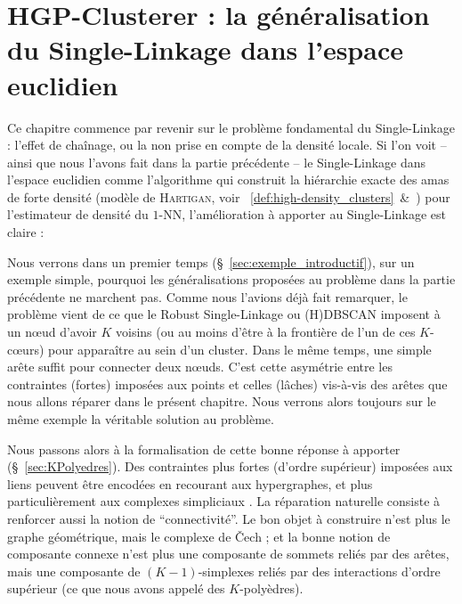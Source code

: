 \chapter{HGP-Clusterer : la généralisation du Single-Linkage dans l'espace euclidien} 
\label{chap:hgp_clusterer}

Ce chapitre commence par revenir sur le problème fondamental du Single-Linkage : l'effet de chaînage, ou la non prise en compte de la densité locale.
Si l'on voit -- ainsi que nous l'avons fait dans la partie précédente -- le Single-Linkage dans l'espace euclidien comme l'algorithme qui construit la hiérarchie exacte des amas de forte densité (modèle de \textsc{Hartigan}, voir \Def~\ref{def:high-density_clusters}~\&~) pour l'estimateur de densité du $1$-NN, l'amélioration à apporter au Single-Linkage est claire :

Nous verrons dans un premier temps (\S~\ref{sec:exemple_introductif}), sur un exemple simple, pourquoi les généralisations proposées au problème dans la partie précédente ne marchent pas. 
Comme nous l'avions déjà fait remarquer, le problème vient de ce que le Robust Single-Linkage \cite{RobustSingleLinkage2010} ou (H)DBSCAN \cite{HDBSCAN, HDBSCAN2017} imposent à un n\oe ud d'avoir $K$ voisins  (ou au moins d'être à la frontière de l'un de ces $K$-cœurs) pour apparaître au sein d'un cluster. Dans le même temps, une simple arête suffit pour connecter deux n\oe uds.
C'est cette asymétrie entre les contraintes (fortes) imposées aux points et celles (lâches) vis-à-vis des arêtes que nous allons réparer dans le présent chapitre.
Nous verrons alors toujours sur le même exemple la véritable solution au problème.

Nous passons alors à la formalisation de cette bonne réponse à apporter (\S~\ref{sec:KPolyedres}).
Des contraintes plus fortes (d'ordre supérieur) imposées aux liens peuvent être encodées en recourant aux hypergraphes, et plus particulièrement aux complexes simpliciaux \cite{Munkres}.
La réparation naturelle consiste à renforcer aussi la notion de ``connectivité''. 
Le bon objet à construire n'est plus le graphe géométrique, mais le complexe de \v Cech \cite{Cech1932, BobrowskiKahle} ; et la bonne notion de composante connexe n'est plus une composante de sommets reliés par des arêtes, mais une composante de $(K-1)$-simplexes reliés par des interactions d'ordre supérieur (ce que nous avons appelé des $K$-polyèdres).

